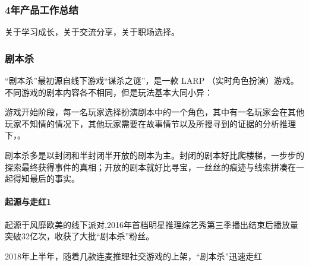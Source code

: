 \documentclass[letterpaper,10pt,english]{sphinxmanual}
\begin{document}
\subsubsection{4年产品工作总结}
\label{\detokenize{chapter_experience/4years:id1}}\label{\detokenize{chapter_experience/4years::doc}}
关于学习成长，关于交流分享，关于职场选择。


\subsubsection{剧本杀}
\label{\detokenize{chapter_experience/jubensha:id1}}\label{\detokenize{chapter_experience/jubensha::doc}}
“剧本杀”最初源自线下游戏“谋杀之谜”，是一款 LARP
（实时角色扮演）游戏。不同游戏的剧本内容各不相同，但是玩法基本大同小异：

游戏开始阶段，每一名玩家选择扮演剧本中的一个角色，其中有一名玩家会在其他玩家不知情的情况下，其他玩家需要在故事情节以及所搜寻到的证据的分析推理下，。

剧本杀多是以封闭和半封闭半开放的剧本为主。封闭的剧本好比爬楼梯，一步步的探索最终获得事件的真相；开放的剧本就好比寻宝，一丝丝的痕迹与线索拼凑在一起得知最后的事实。


\paragraph{起源与走红1\sphinxfootnotemark[691]}
\label{\detokenize{chapter_experience/jubensha:id2}}%
\begin{footnotetext}[691]\sphinxAtStartFootnote
{}
%
\end{footnotetext}\ignorespaces 
起源于风靡欧美的线下派对,2016年首档明星推理综艺秀第三季播出结束后播放量突破32亿次，收获了大批“剧本杀”粉丝。

2018年上半年，随着几款连麦推理社交游戏的上架，“剧本杀”迅速走红
\end{document}
